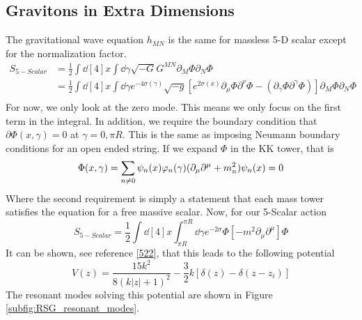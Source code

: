 \documentclass[12pt]{article}
\newcommand{\pd}{\partial}
\begin{document}
\subsection{Gravitons in Extra Dimensions}
The gravitational wave equation $h_{MN}$ is the same for massless 5-D scalar
except for the normalization factor.
\begin{align}
    S_{5-Scalar} &= \frac{1}{2} \int \dd[4]{x} \int \dd \gamma \sqrt{-G} G^{MN}
    \pd_M \Phi \pd_N \Phi \\
                 &= \frac{1}{2} \int \dd[4]{x} \int \dd \gamma
                 e^{-4\sigma(\gamma)} \sqrt{-g} \left[ e^{2\sigma(x)} \pd_\mu
                 \Phi \pd^\nu \Phi - ( \pd_\gamma \Phi \pd^\gamma \Phi ) \right]
    \pd_M \Phi \pd_N \Phi \\
\end{align}
For now, we only look at the zero mode. This means we only focus on the first
term in the integral. In addition, we require the boundary condition that
$\pd\Phi(x,\gamma)=0$ at $\gamma=0, \pi R$. This is the same as imposing Neumann
boundary conditions for an open ended string. If we expand $\Phi$ in the KK
tower, that is
\begin{equation}
    \Phi(x,\gamma) = \sum_{n\neq 0} \psi_n(x) \varphi_n (\gamma) \\
    (\pd_\mu \pd^\mu + m_n^2) \psi_n(x) = 0
\end{equation}
Where the second requirement is simply a statement that each mass tower
satisfies the equation for a free massive scalar. Now, for our 5-Scalar action
\begin{equation}
    S_{5-Scalar} = \frac{1}{2} \int \dd[4]{x} \int^{\pi R}_{\pi R} \dd \gamma
    e^{-2\sigma} \Phi \left[ -m^2 \pd_\mu \pd^\mu \right] \Phi 
\end{equation}
It can be shown, see reference \ref{522}, that this leads to the following
potential
\begin{equation}
    V(z) = \frac{15k^2}{8(k|z|+1)^2} - \frac{3}{2}k\left[ \delta(z) - \delta(z -
    z_i) \right]
\end{equation}
The resonant modes solving this potential are shown in Figure
\ref{subfig:RSG_resonant_modes}.


\newpage


\end{document}
